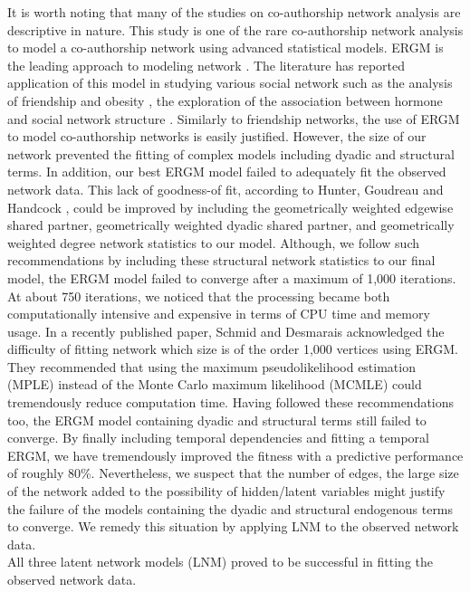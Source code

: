 It is worth noting that many of the studies on co-authorship network analysis are descriptive in nature. This study is one of the rare co-authorship network analysis to model a co-authorship network using advanced statistical models. ERGM is the leading approach to modeling network \cite{schmid_exponential_2017}. The literature has reported application of this model in studying various social network such as the analysis of friendship and obesity \cite{valente_adolescent_2009,de_la_haye_obesity-related_2010}, the exploration of the association between hormone and social network structure \cite{kornienko_hormones_2014}. Similarly to friendship networks, the use of ERGM to model co-authorship networks is easily justified. However, the size of our network prevented the fitting of complex models including dyadic and structural terms. In addition, our best ERGM model failed to adequately fit the observed network data. This lack of goodness-of fit, according to Hunter, Goudreau and Handcock \cite{hunter_goodness_2008}, could be improved by including the geometrically weighted edgewise shared partner, geometrically weighted dyadic shared partner, and geometrically weighted degree network statistics to our model. Although, we follow such recommendations by including these structural network statistics to our final model, the ERGM model failed to converge after a maximum of 1,000 iterations. At about 750 iterations, we noticed that the processing became both computationally intensive and expensive in terms of CPU time and memory usage. In a recently published paper, Schmid and Desmarais \cite{schmid_exponential_2017} acknowledged the difficulty of fitting network which size is of the order 1,000 vertices using ERGM. They recommended that using the maximum pseudolikelihood estimation (MPLE) instead of the Monte Carlo maximum likelihood (MCMLE) could tremendously reduce computation time. Having followed these recommendations too, the ERGM model containing dyadic and structural terms still failed to converge. By finally including temporal dependencies and fitting a temporal ERGM, we have tremendously improved the fitness with a predictive performance of roughly 80\%. Nevertheless, we suspect that the number of edges, the large size of the network added to the possibility of hidden/latent variables might justify the failure of the models containing the dyadic and structural endogenous terms to converge. We remedy this situation by applying LNM to the observed network data. \\
All three latent network models (LNM) proved to be successful in fitting the observed network data. 
